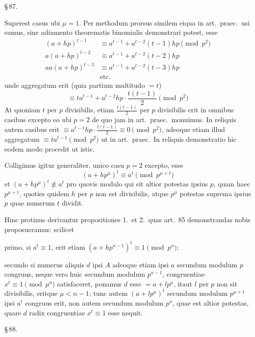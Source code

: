 \documentclass[12pt,a4paper]{article}
\theoremstyle{plain}
\theoremstyle{definition}
\theoremstyle{remark}
\begin{document}
\begin{center}\S\,87.\end{center}

Superest casus ubi $\mu = 1$. Per methodum prorsus similem eiqua in art.\ praec.\ usi sumus, sine adiumento theorematis binomialis demonstrari potest, esse
\begin{align*}
(a + hp)^{t-1} &\equiv a^{t-1} + a^{t-2}(t-1)hp \pmod{p^2} \\
a(a + hp)^{t-2} &\equiv a^{t-1} + a^{t-2}(t-2)hp \\
aa(a + hp)^{t-3} &\equiv a^{t-1} + a^{t-2}(t-3)hp \\
&\text{etc.}
\end{align*}
unde aggregatum erit (quia partium multitudo $= t$)
\[
\equiv ta^{t-1} + a^{t-2}hp \cdot \frac{t(t-1)}{2} \pmod{p^2}
\]
At quoniam $t$ per $p$ divisibilis, etiam $\frac{t(t-1)}{2}$ per $p$ divisibilis erit in omnibus casibus excepto eo ubi $p = 2$ de quo jam in art.\ praec.\ monuimus. In reliquis autem casibus erit $\equiv a^{t-1}hp \cdot \frac{t(t-1)}{2} \equiv 0 \pmod{p^2}$, adeoque etiam illud aggregatum $\equiv ta^{t-1} \pmod{p^2}$ ut in art.\ praec.\ In reliquis demonstratio hic eodem modo procedit ut istic.

Colligimus igitur generaliter, unico casu $p = 2$ excepto, esse
\[
(a + hp^\mu)^t \equiv a^t \pmod{p^{\mu+1}}
\]
et $(a + hp^\mu)^t \not\equiv a^t$ pro quovis modulo qui sit altior potestas ipsius $p$, quam haec $p^{\mu+1}$, quoties quidem $h$ per $p$ non est divisibilis, atque $p^\mu$ potestas suprema ipsius $p$ quae numerum $t$ dividit.

Hinc protinus derivantur propositiones 1.\ et 2.\ quas art.~85 demonstrandas nobis proposueramus: scilicet

primo, si $a^t \equiv 1$, erit etiam $(a + hp^{n-1})^t \equiv 1 \pmod{p^n}$;

secundo si numerus aliquis $d$ ipsi $A$ adeoque etiam ipsi $a$ secundum modulum $p$ congruus, neque vero huic secundum modulum $p^{n-1}$, congruentiae $x^t \equiv 1 \pmod{p^n}$ satisfaceret, ponamus $d$ esse $= a + lp^\mu$, itaut $l$ per $p$ non sit divisibilis, eritque $\mu < n - 1$; tunc autem $(a + lp^\mu)^t$ secundum modulum $p^{\mu+1}$ ipsi $a^t$ congruus erit, non autem secundum modulum $p^n$, quae est altior potestas, quare $d$ radix congruentiae $x^t \equiv 1$ esse nequit.

\begin{center}\S\,88.\end{center}
\end{document}
